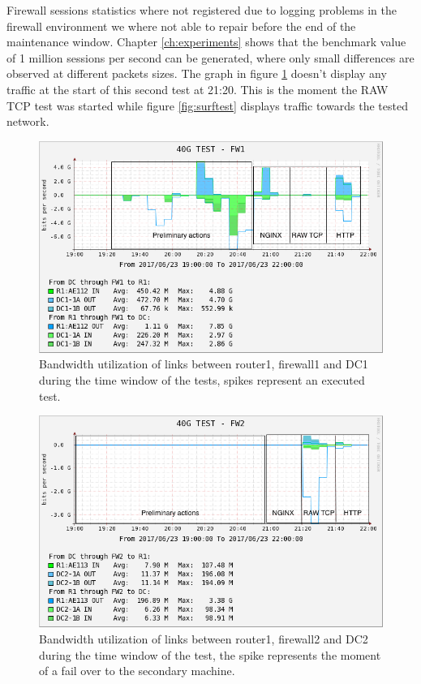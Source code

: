 Firewall sessions statistics where not registered due to logging problems in the firewall environment we where not able to repair before the end of the maintenance window. 
Chapter \ref{ch:experiments} shows that the benchmark value of 1 million sessions per second can be generated, where only small differences are observed at different packets sizes. 
The graph in figure \ref{fig:testrealusageae112} doesn't display any traffic at the start of this second test at 21:20. This is the moment the RAW TCP test was started while figure \ref{fig:surftest} displays traffic towards the tested network. 
 
\begin{figure}[H]
  \includegraphics[scale=0.5]{images/real-ae112.png}
  \caption{Bandwidth utilization of links between router1, firewall1 and DC1 during the time window of the tests, spikes represent an executed test.}
  \label{fig:testrealusageae112}
\end{figure}

\begin{figure}[H]
  \includegraphics[scale=0.5]{images/real-ae113.png}
  \caption{Bandwidth utilization of links between router1, firewall2 and DC2 during the time window of the test, the spike represents the moment of a fail over to the secondary machine.}
  \label{fig:testrealusageae113}
\end{figure}

